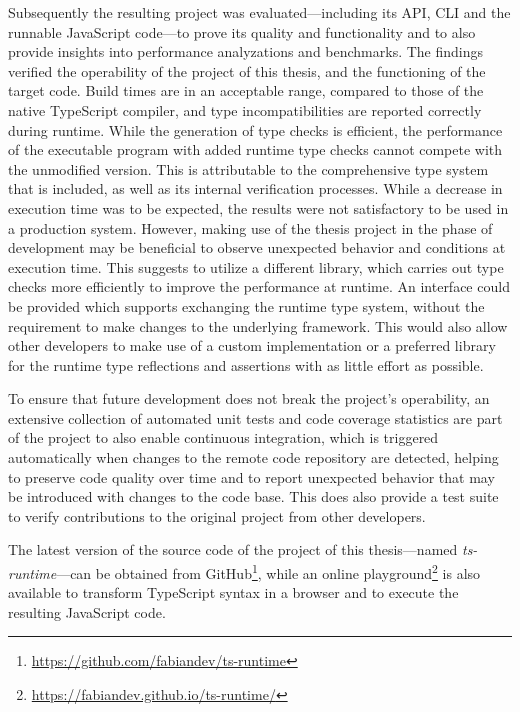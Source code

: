 Subsequently the resulting project was evaluated---including its API, CLI and the runnable JavaScript code---to prove its quality and functionality and to also provide insights into performance analyzations and benchmarks. The findings verified the operability of the project of this thesis, and the functioning of the target code. Build times are in an acceptable range, compared to those of the native TypeScript compiler, and type incompatibilities are reported correctly during runtime. While the generation of type checks is efficient, the performance of the executable program with added runtime type checks cannot compete with the unmodified version. This is attributable to the comprehensive type system that is included, as well as its internal verification processes. While a decrease in execution time was to be expected, the results were not satisfactory to be used in a production system. However, making use of the thesis project in the phase of development may be beneficial to observe unexpected behavior and conditions at execution time. This suggests to utilize a different library, which carries out type checks more efficiently to improve the performance at runtime. An interface could be provided which supports exchanging the runtime type system, without the requirement to make changes to the underlying framework. This would also allow other developers to make use of a custom implementation or a preferred library for the runtime type reflections and assertions with as little effort as possible.

To ensure that future development does not break the project's operability, an extensive collection of automated unit tests and code coverage statistics are part of the project to also enable continuous integration, which is triggered automatically when changes to the remote code repository are detected, helping to preserve code quality over time and to report unexpected behavior that may be introduced with changes to the code base. This does also provide a test suite to verify contributions to the original project from other developers.

The latest version of the source code of the project of this thesis---named \emph{ts-runtime}---can be obtained from GitHub\footnote{\url{https://github.com/fabiandev/ts-runtime}}, while an online playground\footnote{\url{https://fabiandev.github.io/ts-runtime/}} is also available to transform TypeScript syntax in a browser and to execute the resulting JavaScript code.
